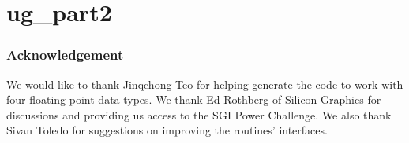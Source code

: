 \part{ug_part2}

\section{Acknowledgement}
We would like to thank Jinqchong Teo for helping generate the code
to work with four floating-point data types. 
We thank Ed Rothberg of Silicon Graphics for discussions and providing us
access to the SGI Power Challenge. We also thank Sivan Toledo for 
suggestions on improving the routines' interfaces.


\pagebreak







